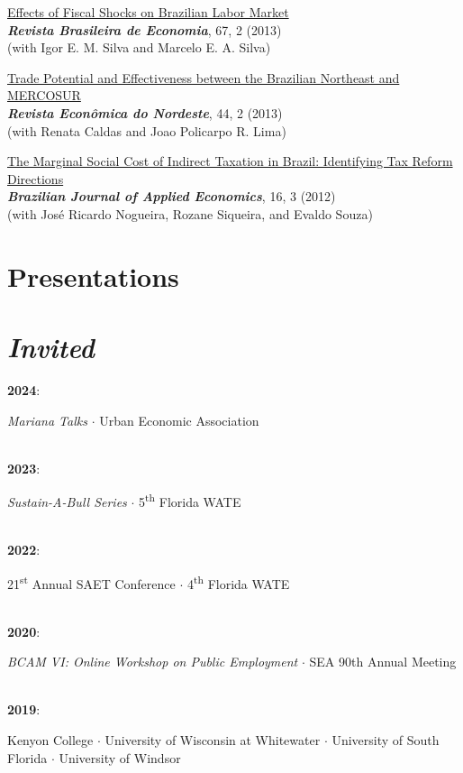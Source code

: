 \documentclass[mm, 10pt]{simple_style}
\begin{document}
\begin{resume}
\href{http://bibliotecadigital.fgv.br/ojs/index.php/rbe/article/view/3890}{Effects of Fiscal Shocks on Brazilian Labor Market} \\
\textbf{\textit{Revista Brasileira de Economia}}, 67, 2 (2013) \\
(with Igor E. M. Silva and Marcelo E. A. Silva) 

\href{https://www.bnb.gov.br/revista/index.php/ren/article/view/78/58}{Trade Potential and Effectiveness between the Brazilian Northeast and MERCOSUR} \\
\textbf{\textit{Revista Econ\^omica do Nordeste}}, 44, 2 (2013) \\
(with Renata Caldas and Joao Policarpo R. Lima) 

\href{https://www.scielo.br/scielo.php?pid=S1413-80502012000300001&script=sci_arttext}{The Marginal Social Cost of Indirect Taxation in Brazil: Identifying Tax Reform Directions} \\
\textbf{\textit{Brazilian Journal of Applied Economics}}, 16, 3 (2012) \\
(with Jos\'e Ricardo Nogueira, Rozane Siqueira, and Evaldo Souza)


\section{Presentations \\ {\protect\footnotesize {} \\ \emph{Invited}}}

\textbf{2024}: \begin{minipage}[t]{0.9\textwidth}
        \emph{Mariana Talks}
        $\cdot$ {\color{gray} Urban Economic Association}
        \end{minipage}\\
\textbf{2023}: \begin{minipage}[t]{0.9\textwidth}
        \emph{Sustain-A-Bull Series}
        $\cdot$ 5\textsuperscript{th} Florida WATE
        \end{minipage}\\
\textbf{2022}: \begin{minipage}[t]{0.9\textwidth}
        21\textsuperscript{st} Annual SAET Conference 
        $\cdot$ 4\textsuperscript{th} Florida WATE 
        \end{minipage}\\
\textbf{2020}: \begin{minipage}[t]{0.9\textwidth}
        \emph{BCAM VI: Online Workshop on Public Employment} $\cdot$ SEA 90th Annual Meeting
        \end{minipage}\\        
\textbf{2019}: \begin{minipage}[t]{0.9\textwidth}
        Kenyon College 
        $\cdot$ University of Wisconsin at Whitewater 
        $\cdot$ University of South Florida 
        $\cdot$ University of Windsor 
        \end{minipage}\\         



\end{resume}
\end{document}
